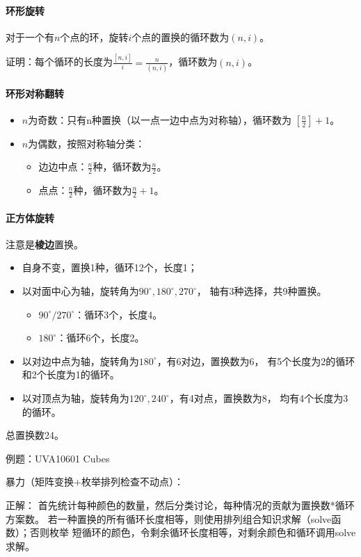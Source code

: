 \paragraph{环形旋转}
对于一个有$n$个点的环，旋转$i$个点的置换的循环数为$(n,i)$。

证明：每个循环的长度为$\frac{[n,i]}{i}=\frac{n}{(n,i)}$，循环数为$(n,i)$。
\paragraph{环形对称翻转}
\begin{itemize}
	\item $n$为奇数：只有n种置换（以一点一边中点为对称轴），循环数为
	      $[\frac{n}{2}]+1$。
	\item $n$为偶数，按照对称轴分类：
		  \begin{itemize}
		      \item 边边中点：$\frac{n}{2}$种，循环数为$\frac{n}{2}$。
		      \item 点点：$\frac{n}{2}$种，循环数为$\frac{n}{2}+1$。
	      \end{itemize}
\end{itemize}
\paragraph{正方体旋转}
注意是{\bfseries 棱边}置换。
\begin{itemize}
	\item 自身不变，置换1种，循环12个，长度1；
	\item 以对面中心为轴，旋转角为$90^\circ,180^\circ,270^\circ$，
	      轴有3种选择，共9种置换。
	      \begin{itemize}
		      \item $90^\circ/270^\circ$：循环3个，长度4。
		      \item $180^\circ$：循环6个，长度2。
	      \end{itemize}
	\item 以对边中点为轴，旋转角为$180^\circ$，有6对边，置换数为6，
	      有5个长度为2的循环和2个长度为1的循环。
	\item 以对顶点为轴，旋转角为$120^\circ,240^\circ$，有4对点，置换数为8，
	      均有4个长度为3的循环。
\end{itemize}
总置换数24。

例题：UVA10601 Cubes

暴力（矩阵变换+枚举排列检查不动点）：


正解：
首先统计每种颜色的数量，然后分类讨论，每种情况的贡献为置换数*循环方案数。
若一种置换的所有循环长度相等，则使用排列组合知识求解（solve函数）；否则枚举
短循环的颜色，令剩余循环长度相等，对剩余颜色和循环调用solve求解。


